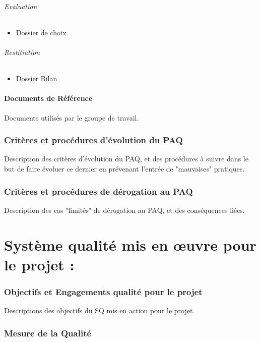 \documentclass[a4paper, 18pt]{article}
\begin{document}
\paragraph*{Evaluation}
\begin{itemize}
\item Dossier de choix 
\end{itemize}

\paragraph*{Restitiution} 
\begin{itemize}
\item Dossier Bilan
\end{itemize}

\subsection{Documents de Référence}

Documents utilisés par le groupe de travail.

\section{Critères et procédures d'évolution du PAQ}

Description des critères d'évolution du PAQ, et des procédures à suivre dans le but de faire évoluer ce dernier en prévenant l'entrée de "mauvaises" pratiques.

\section{Critères et procédures de dérogation au PAQ}

Description des cas "limités" de dérogation au PAQ, et des conséquences liées.

\part{Système qualité mis en œuvre pour le projet :}

\section{Objectifs et Engagements qualité pour le projet}

Descriptions des objectifs du SQ mis en action pour le projet.

\section{Mesure de la Qualité}
\end{document}
